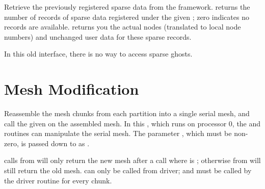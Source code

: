 
Retrieve the previously registered sparse data from the framework.
 returns the number of records of sparse
data registered under the given ; zero indicates no records
are available.   returns you the actual nodes
(translated to local node numbers) and unchanged user data for
these sparse records.

In this old interface, there is no way to access sparse ghosts.



\newpage
\section{Mesh Modification}



Reassemble the mesh chunks from each partition into a single serial mesh,
and call the given  on the assembled mesh.
In this , which runs on processor 0, the  and  routines
can manipulate the serial mesh.  The parameter , which must
be non-zero, is passed down to  as .

 calls from
 will only return the new mesh after a  call
where  is ; otherwise  from  will still
return the old mesh.
 can only be called from driver; and must be called by the driver routine for
every chunk. 

